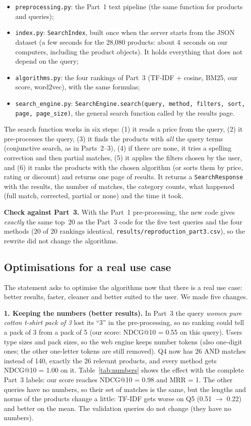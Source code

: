 \documentclass[11pt,a4paper]{article}
\newcommand{\code}[1]{\texttt{#1}}
\begin{document}
\begin{itemize}
\item \code{preprocessing.py}: the Part~1 text pipeline (the same function for products and queries);
\item \code{index.py}: \code{SearchIndex}, built once when the server starts from the JSON dataset (a few seconds for
the 28,080 products: about 4~seconds on our computers, including the product objects). It holds everything that does not
depend on the query;
\item \code{algorithms.py}: the four rankings of Part~3 (TF-IDF + cosine, BM25, our score, word2vec), with the same
formulas;
\item \code{search\_engine.py}: \code{SearchEngine.search(query, method, filters, sort, page, page\_size)}, the general
search function called by the results page.
\end{itemize}

The search function works in six steps: (1) it reads a price from the query, (2) it pre-processes the query, (3) it
finds the products with \emph{all} the query terms (conjunctive search, as in Parts~2--3), (4) if there are none, it
tries a spelling correction and then partial matches, (5) it applies the filters chosen by the user, and (6) it ranks
the products with the chosen algorithm (or sorts them by price, rating or discount) and returns one page of results.
It returns a \code{SearchResponse} with the results, the number of matches, the category counts, what happened
(full match, corrected, partial or none) and the time it took.

\textbf{Check against Part~3.} With the Part~1 pre-processing, the new code gives \emph{exactly} the same top~20 as the
Part~3 code for the five test queries and the four methods (20 of 20 rankings identical,
\code{results/reproduction\_part3.csv}), so the rewrite did not change the algorithms.

\subsection{Optimisations for a real use case}
The statement asks to optimise the algorithms now that there is a real use case: better results, faster, cleaner
and better suited to the user. We made five changes.

\textbf{1. Keeping the numbers (better results).} In Part~3 the query \emph{women pure cotton t-shirt pack of 3} lost
its ``3'' in the pre-processing, so no ranking could tell a pack of 3 from a pack of 5 (our score: NDCG@10 = 0.55 on
this query). Users type sizes and pack sizes, so the web engine keeps number tokens (also one-digit ones; the other
one-letter tokens are still removed). Q4 now has 26 AND matches instead of 140, exactly the 26 relevant products, and
every method gets NDCG@10 = 1.00 on it. Table~\ref{tab:numbers} shows the effect with the complete Part~3 labels: our
score reaches NDCG@10 = 0.98 and MRR = 1. The other queries have no numbers, so their set of matches is the same, but
the lengths and norms of the products change a little: TF-IDF gets worse on Q5 (0.51 $\to$ 0.22) and better on the
mean. The validation queries do not change (they have no numbers).
\end{document}
